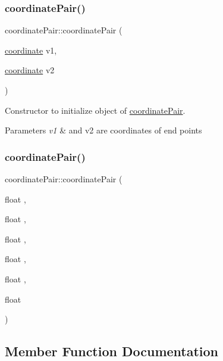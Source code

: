 \subsubsection{\texorpdfstring{coordinate\+Pair()}{coordinatePair()}\hspace{0.1cm}{\footnotesize\ttfamily [2/3]}}
{\footnotesize\ttfamily coordinate\+Pair\+::coordinate\+Pair (\begin{DoxyParamCaption}\item[{\mbox{\hyperlink{structcoordinate}{coordinate}}}]{v1,  }\item[{\mbox{\hyperlink{structcoordinate}{coordinate}}}]{v2 }\end{DoxyParamCaption})}



Constructor to initialize object of \mbox{\hyperlink{structcoordinate_pair}{coordinate\+Pair}}. 


\begin{DoxyParams}{Parameters}
{\em v1} & and v2 are coordinates of end points \\
\hline
\end{DoxyParams}
\mbox{\label{structcoordinate_pair_a7a428006c121bc4d437fefbe36b46824}} 
\subsubsection{\texorpdfstring{coordinate\+Pair()}{coordinatePair()}\hspace{0.1cm}{\footnotesize\ttfamily [3/3]}}
{\footnotesize\ttfamily coordinate\+Pair\+::coordinate\+Pair (\begin{DoxyParamCaption}\item[{float}]{,  }\item[{float}]{,  }\item[{float}]{,  }\item[{float}]{,  }\item[{float}]{,  }\item[{float}]{ }\end{DoxyParamCaption})}



\subsection{Member Function Documentation}
\mbox{\label{structcoordinate_pair_a28f2d157511e46858d4cd253973959dd}} 
